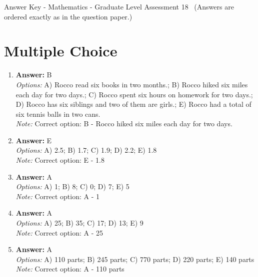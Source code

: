 \documentclass[12pt]{article}
\begin{document}
\begin{center}
Answer Key - Mathematics - Graduate Level Assessment 18 \
\small (Answers are ordered exactly as in the question paper.)
\end{center}

\section*{Multiple Choice}
\begin{enumerate}[label=\arabic*.]
\item \textbf{Answer:} B
\\ \textit{Options:} A) Rocco read six books in two months.; B) Rocco hiked six miles each day for two days.; C) Rocco spent six hours on homework for two days.; D) Rocco has six siblings and two of them are girls.; E) Rocco had a total of six tennis balls in two cans.
\\ \textit{Note:} Correct option: B - Rocco hiked six miles each day for two days.
\item \textbf{Answer:} E
\\ \textit{Options:} A) 2.5; B) 1.7; C) 1.9; D) 2.2; E) 1.8
\\ \textit{Note:} Correct option: E - 1.8
\item \textbf{Answer:} A
\\ \textit{Options:} A) 1; B) 8; C) 0; D) 7; E) 5
\\ \textit{Note:} Correct option: A - 1
\item \textbf{Answer:} A
\\ \textit{Options:} A) 25; B) 35; C) 17; D) 13; E) 9
\\ \textit{Note:} Correct option: A - 25
\item \textbf{Answer:} A
\\ \textit{Options:} A) 110 parts; B) 245 parts; C) 770 parts; D) 220 parts; E) 140 parts
\\ \textit{Note:} Correct option: A - 110 parts
\end{enumerate}
\end{document}
